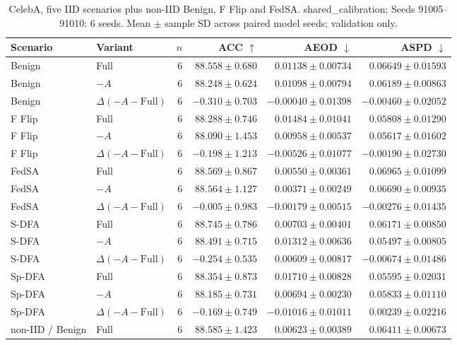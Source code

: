 \begin{table}[t]
\centering
\small
\caption{CelebA, five IID scenarios plus non-IID Benign, F Flip and FedSA. shared\_calibration; Seeds 91005–91010: 6 seeds. Mean $\pm$ sample SD across paired model seeds; validation only.}
\begin{tabular}{llrrrr}
\toprule
Scenario & Variant & $n$ & ACC $\uparrow$ & AEOD $\downarrow$ & ASPD $\downarrow$ \\
\midrule
Benign & Full & 6 & $88.558 \pm 0.680$ & $0.01138 \pm 0.00734$ & $0.06649 \pm 0.01593$ \\
Benign & $-A$ & 6 & $88.248 \pm 0.624$ & $0.01098 \pm 0.00794$ & $0.06189 \pm 0.00863$ \\
Benign & $\Delta(-A-\mathrm{Full})$ & 6 & $-0.310 \pm 0.703$ & $-0.00040 \pm 0.01398$ & $-0.00460 \pm 0.02052$ \\
F Flip & Full & 6 & $88.288 \pm 0.746$ & $0.01484 \pm 0.01041$ & $0.05808 \pm 0.01290$ \\
F Flip & $-A$ & 6 & $88.090 \pm 1.453$ & $0.00958 \pm 0.00537$ & $0.05617 \pm 0.01602$ \\
F Flip & $\Delta(-A-\mathrm{Full})$ & 6 & $-0.198 \pm 1.213$ & $-0.00526 \pm 0.01077$ & $-0.00190 \pm 0.02730$ \\
FedSA & Full & 6 & $88.569 \pm 0.867$ & $0.00550 \pm 0.00361$ & $0.06965 \pm 0.01099$ \\
FedSA & $-A$ & 6 & $88.564 \pm 1.127$ & $0.00371 \pm 0.00249$ & $0.06690 \pm 0.00935$ \\
FedSA & $\Delta(-A-\mathrm{Full})$ & 6 & $-0.005 \pm 0.983$ & $-0.00179 \pm 0.00515$ & $-0.00276 \pm 0.01435$ \\
S-DFA & Full & 6 & $88.745 \pm 0.786$ & $0.00703 \pm 0.00401$ & $0.06171 \pm 0.00850$ \\
S-DFA & $-A$ & 6 & $88.491 \pm 0.715$ & $0.01312 \pm 0.00636$ & $0.05497 \pm 0.00805$ \\
S-DFA & $\Delta(-A-\mathrm{Full})$ & 6 & $-0.254 \pm 0.535$ & $0.00609 \pm 0.00817$ & $-0.00674 \pm 0.01486$ \\
Sp-DFA & Full & 6 & $88.354 \pm 0.873$ & $0.01710 \pm 0.00828$ & $0.05595 \pm 0.02031$ \\
Sp-DFA & $-A$ & 6 & $88.185 \pm 0.731$ & $0.00694 \pm 0.00230$ & $0.05833 \pm 0.01110$ \\
Sp-DFA & $\Delta(-A-\mathrm{Full})$ & 6 & $-0.169 \pm 0.749$ & $-0.01016 \pm 0.01011$ & $0.00239 \pm 0.02216$ \\
non-IID / Benign & Full & 6 & $88.585 \pm 1.423$ & $0.00623 \pm 0.00389$ & $0.06411 \pm 0.00673$ \\

\end{tabular}
\end{table}
